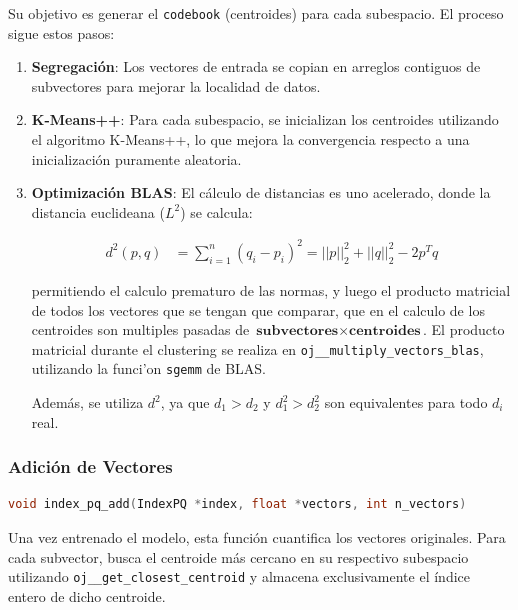 Su objetivo es generar el \verb|codebook| (centroides) para cada subespacio.
El proceso sigue estos pasos:
\begin{enumerate}
  \item \textbf{Segregaci\'on}: 
    Los vectores de entrada se copian en arreglos contiguos de subvectores
    para mejorar la localidad de datos.

  \item \textbf{K-Means++}: 
    Para cada subespacio, se inicializan los centroides utilizando el algoritmo 
    K-Means++\cite{wiki:K-means}, lo que mejora la convergencia respecto a una
    inicializaci\'on puramente aleatoria.

  \item \textbf{Optimizaci\'on BLAS}:
    El c\'alculo de distancias es uno acelerado, donde la 
    distancia euclideana (\(L^2\)) se calcula\cite{samuelalbanie}:

\begin{align}
    d^2(p, q) &= \sum_{i=1}^{n}{(q_i - p_i)^2} 
    = ||p||_2^2 + ||q||_2^2 - 2p^Tq
\end{align}

    permitiendo el calculo prematuro de las normas, y luego el producto 
    matricial de todos los vectores que se tengan que comparar, que en el 
    calculo de los centroides son multiples pasadas de 
    \(\textbf{subvectores}\times\textbf{centroides}\).
    El producto matricial durante el clustering se realiza en 
    \verb|oj__multiply_vectors_blas|, utilizando la funci'on \verb|sgemm| de
    BLAS. 

    Adem\'as, se utiliza \(d^2\), ya que 
    \(d_1 > d_2\) y \(d_1^2 > d_2^2\) son equivalentes para todo \(d_i\) real.
    

\end{enumerate}

\subsubsection{Adici\'on de Vectores}

\begin{lstlisting}[language=C, caption=Agregar Vectores al \'Indice]
void index_pq_add(IndexPQ *index, float *vectors, int n_vectors)
\end{lstlisting}

Una vez entrenado el modelo, esta funci\'on cuantifica los vectores originales.
Para cada subvector, busca el centroide m\'as cercano en su respectivo
subespacio utilizando \verb|oj__get_closest_centroid| y almacena exclusivamente
el \'indice entero de dicho centroide.

